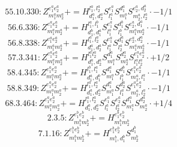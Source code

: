 \documentclass[letterpaper,10pt,fleqn,leqno,onecolumn]{article}
\begin{document}
\begin{equation} \;\;\;\;\;\;  55.10.330: Z^{e_{1}^{a}e_{2}^{a}}_{m_{1}^{a}m_{2}^{a}}+=H^{l_{1}^{a},l_{2}^{a}}_{d_{1}^{a},d_{2}^{a}}S^{e_{1}^{a}}_{l_{1}^{a}}S^{d_{1}^{a}}_{m_{1}^{a}}S^{e_{2}^{a},d_{2}^{a}}_{m_{2}^{a},l_{2}^{a}}\cdot -1/1 \end{equation}
\begin{equation} \;\;\;\;\;\;  56.6.336: Z^{e_{1}^{a}e_{2}^{a}}_{m_{1}^{a}m_{2}^{a}}+=H^{l_{1}^{a},l_{1}^{b}}_{d_{1}^{b},d_{1}^{a}}S^{e_{1}^{a}}_{l_{1}^{a}}S^{d_{1}^{b}}_{l_{1}^{b}}S^{e_{2}^{a},d_{1}^{a}}_{m_{1}^{a}m_{2}^{a}}\cdot -1/1 \end{equation}
\begin{equation} \;\;\;\;\;\;  56.8.338: Z^{e_{1}^{a}e_{2}^{a}}_{m_{1}^{a}m_{2}^{a}}+=H^{l_{1}^{a},l_{2}^{a}}_{d_{1}^{a},d_{2}^{a}}S^{e_{1}^{a}}_{l_{1}^{a}}S^{d_{1}^{a}}_{l_{2}^{a}}S^{e_{2}^{a},d_{2}^{a}}_{m_{1}^{a}m_{2}^{a}}\cdot -1/1 \end{equation}
\begin{equation} \;\;\;\;\;\;  57.3.341: Z^{e_{1}^{a}e_{2}^{a}}_{m_{1}^{a}m_{2}^{a}}+=H^{l_{1}^{a}l_{2}^{a}}_{d_{1}^{a},d_{2}^{a}}S^{d_{1}^{a}}_{m_{1}^{a}}S^{d_{2}^{a}}_{m_{2}^{a}}S^{e_{1}^{a}e_{2}^{a}}_{l_{1}^{a}l_{2}^{a}}\cdot +1/2 \end{equation}
\begin{equation} \;\;\;\;\;\;  58.4.345: Z^{e_{1}^{a}e_{2}^{a}}_{m_{1}^{a}m_{2}^{a}}+=H^{l_{1}^{b},l_{1}^{a}}_{d_{1}^{a},d_{1}^{b}}S^{d_{1}^{a}}_{m_{1}^{a}}S^{d_{1}^{b}}_{l_{1}^{b}}S^{e_{1}^{a}e_{2}^{a}}_{m_{2}^{a},l_{1}^{a}}\cdot -1/1 \end{equation}
\begin{equation} \;\;\;\;\;\;  58.8.349: Z^{e_{1}^{a}e_{2}^{a}}_{m_{1}^{a}m_{2}^{a}}+=H^{l_{1}^{a},l_{2}^{a}}_{d_{1}^{a},d_{2}^{a}}S^{d_{1}^{a}}_{m_{1}^{a}}S^{d_{2}^{a}}_{l_{1}^{a}}S^{e_{1}^{a}e_{2}^{a}}_{m_{2}^{a},l_{2}^{a}}\cdot -1/1 \end{equation}
\begin{equation} \;\;\;\;\;\;  68.3.464: Z^{e_{1}^{a}e_{2}^{a}}_{m_{1}^{a}m_{2}^{a}}+=H^{l_{1}^{a},l_{2}^{a}}_{d_{1}^{a},d_{2}^{a}}S^{e_{1}^{a}}_{l_{1}^{a}}S^{e_{2}^{a}}_{l_{2}^{a}}S^{d_{1}^{a}}_{m_{1}^{a}}S^{d_{2}^{a}}_{m_{2}^{a}}\cdot +1/4 \end{equation}
\begin{equation} \;\;\;\;\;\;  2.3.5: Z^{e_{1}^{b}e_{2}^{b}}_{m_{1}^{b}m_{2}^{b}}+=H^{e_{1}^{b}e_{2}^{b}}_{m_{1}^{b}m_{2}^{b}} \end{equation}
\begin{equation} \;\;\;\;\;\;  7.1.16: Z^{e_{1}^{b}e_{2}^{b}}_{m_{1}^{b}m_{2}^{b}}+=H^{e_{1}^{b}e_{2}^{b}}_{m_{1}^{b},d_{1}^{b}}S^{d_{1}^{b}}_{m_{2}^{b}} \end{equation}
\end{document}
